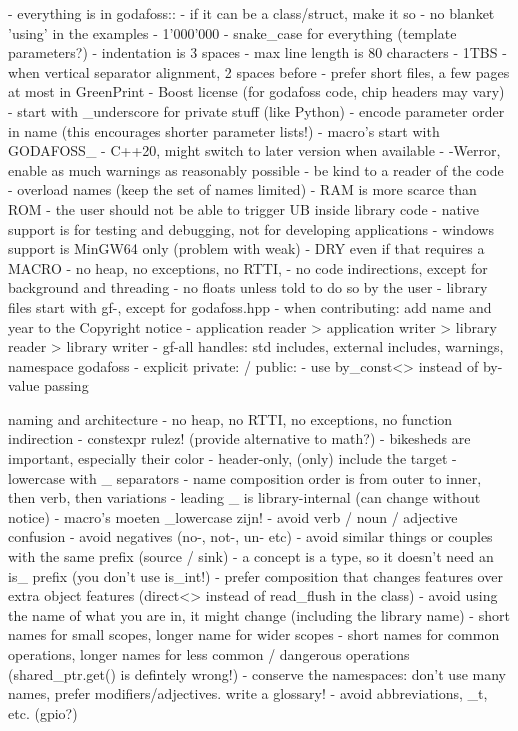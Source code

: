 \documentclass{article}
\begin{document}
- everything is in godafoss::
- if it can be a class/struct, make it so
- no blanket 'using' in the examples
- 1'000'000
- snake_case for everything (template parameters?)
- indentation is 3 spaces
- max line length is 80 characters
- 1TBS
- when vertical separator alignment, 2 spaces before
- prefer short files, a few pages at most in GreenPrint
- Boost license (for godafoss code, chip headers may vary)
- start with _underscore for private stuff (like Python)
- encode parameter order in name (this encourages shorter parameter lists!)
- macro's start with GODAFOSS_
- C++20, might switch to later version when available
- -Werror, enable as much warnings as reasonably possible
- be kind to a reader of the code
- overload names (keep the set of names limited)
- RAM is more scarce than ROM
- the user should not be able to trigger UB inside library code
- native support is for testing and debugging, not for developing applications
- windows support is MinGW64 only (problem with weak)
- DRY even if that requires a MACRO
- no heap, no exceptions, no RTTI,
- no code indirections, except for background and threading
- no floats unless told to do so by the user
- library files start with gf-, except for godafoss.hpp
- when contributing: add name and year to the Copyright notice
- application reader > application writer > library reader > library writer
- gf-all handles: std includes, external includes, warnings, namespace godafoss
- explicit private: / public:
- use by_const<> instead of by-value passing

naming and architecture
- no heap, no RTTI, no exceptions, no function indirection
- constexpr rulez! (provide alternative to math?)
- bikesheds are important, especially their color
- header-only, (only) include the target
- lowercase with _ separators
- name composition order is from outer to inner, then verb, then variations
- leading _ is library-internal (can change without notice)
- macro's moeten _lowercase zijn!
- avoid verb / noun / adjective confusion
- avoid negatives (no-, not-, un- etc)
- avoid similar things or couples with the same prefix (source / sink)
- a concept is a type, so it doesn't need an is_ prefix (you don't use is_int!)
- prefer composition that changes features over extra object features (direct<> instead of read_flush in the class)
- avoid using the name of what you are in, it might change (including the library name)
- short names for small scopes, longer name for wider scopes
- short names for common operations, longer names for less common / dangerous operations (shared_ptr.get() is defintely wrong!)
- conserve the namespaces: don't use many names, prefer modifiers/adjectives. write a glossary!
- avoid abbreviations, _t, etc. (gpio?)
\end{document}
